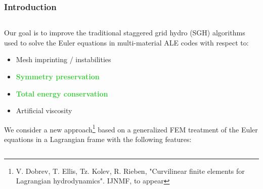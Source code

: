 \documentclass[notes=hide,8pt,xcolor=svgnames]{beamer}
\begin{document}
\begin{frame}
\frametitle{Introduction}
\begin{columns}
\begin{column}{0.55\textwidth}
Our goal is to improve the traditional staggered grid hydro (SGH) algorithms used to solve the Euler equations in multi-material ALE codes with respect to:
\begin{itemize}
   \item Mesh imprinting / instabilities
   \item \textbf<2>{\textcolor<2>{LimeGreen}{Symmetry preservation}}
   \item \textbf<2>{\textcolor<2>{LimeGreen}{Total energy conservation}}
   \item Artificial viscosity
\end{itemize}

\medskip
We consider a new approach\footnote[frame,1]{\tiny V. Dobrev, T. Ellis, Tz. Kolev, R. Rieben, "Curvilinear finite elements for Lagrangian hydrodynamics". IJNMF, to appear} based on a generalized FEM treatment of the Euler equations in a Lagrangian frame with the following features:


\end{column}
\end{columns}
\end{frame}
\end{document}
